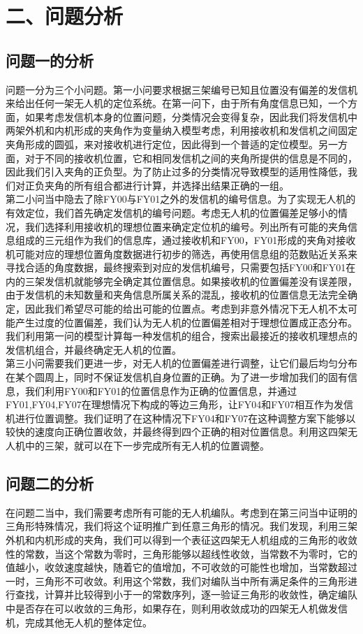 \documentclass{my_paper}
\begin{document}
\section{二、问题分析}
\subsection{问题一的分析}
问题一分为三个小问题。第一小问要求根据三架编号已知且位置没有偏差的发信机来给出任何一架无人机的定位系统。在第一问下，由于所有角度信息已知，一个方面，如果考虑发信机本身的位置问题，分类情况会变得复杂，因此我们将发信机中两架外机和内机形成的夹角作为变量纳入模型考虑，利用接收机和发信机之间固定夹角形成的圆弧，来对接收机进行定位，因此得到一个普适的定位模型。另一方面，对于不同的接收机位置，它和相同发信机之间的夹角所提供的信息是不同的，因此我们引入夹角的正负型。为了防止过多的分类情况导致模型的适用性降低，我们对正负夹角的所有组合都进行计算，并选择出结果正确的一组。\\

第二小问当中隐去了除FY00与FY01之外的发信机的编号信息。为了实现无人机的有效定位，我们首先确定发信机的编号问题。考虑无人机的位置偏差足够小的情况，我们选择利用接收机的理想位置来确定定位机的编号。列出所有可能的夹角信息组成的三元组作为我们的信息库，通过接收机和FY00，FY01形成的夹角对接收机可能对应的理想位置角度数据进行初步的筛选，再使用信息组的范数贴近关系来寻找合适的角度数据，最终搜索到对应的发信机编号，只需要包括FY00和FY01在内的三架发信机就能够完全确定其位置信息。如果接收机的位置偏差没有误差限，由于发信机的未知数量和夹角信息所属关系的混乱，接收机的位置信息无法完全确定，因此我们希望尽可能的给出可能的位置点。考虑到非意外情况下无人机不太可能产生过度的位置偏差，我们认为无人机的位置偏差相对于理想位置成正态分布。我们利用第一问的模型计算每一种发信机的组合，搜索出最接近的接收机理想点的发信机组合，并最终确定无人机的位置。\\

第三小问需要我们更进一步，对无人机的位置偏差进行调整，让它们最后均匀分布在某个圆周上，同时不保证发信机自身位置的正确。为了进一步增加我们的固有信息，我们利用FY00和FY01的位置信息作为正确的位置信息，并通过FY01,FY04,FY07在理想情况下构成的等边三角形，让FY04和FY07相互作为发信机进行位置调整。我们证明了在这种情况下FY04和FY07在这种调整方案下能够以较快的速度向正确位置收敛，并最终得到四个正确的相对位置信息。利用这四架无人机中的三架，就可以在下一步完成所有无人机的位置调整。
\subsection{问题二的分析}
在问题二当中，我们需要考虑所有可能的无人机编队。考虑到在第三问当中证明的三角形特殊情况，我们将这个证明推广到任意三角形的情况。我们发现，利用三架外机和内机形成的夹角，我们可以得到一个表征这四架无人机组成的三角形的收敛性的常数，当这个常数为零时，三角形能够以超线性收敛，当常数不为零时，它的值越小，收敛速度越快，随着它的值增加，不可收敛的可能性也增加，当常数超过一时，三角形不可收敛。利用这个常数，我们对编队当中所有满足条件的三角形进行查找，计算并比较得到小于一的常数序列，逐一验证三角形的收敛性，确定编队中是否存在可以收敛的三角形，如果存在，则利用收敛成功的四架无人机做发信机，完成其他无人机的整体定位。
\end{document}
